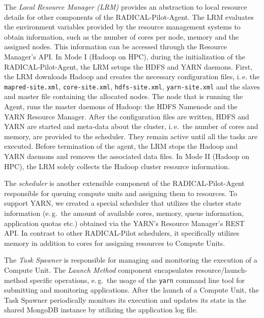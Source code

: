 The \emph{Local Resource Manager (LRM)} provides an abstraction to local resource details for other components of the RADICAL-Pilot-Agent.
The LRM evaluates the environment variables provided by the resource management systems to obtain information, such as the number of cores per node, memory and the assigned nodes.
This information can be accessed through the Resource Manager's API.
In Mode I (Hadoop on HPC), during the initialization of the RADICAL-Pilot-Agent, the LRM setups the HDFS and YARN daemons.
First, the LRM downloads Hadoop and creates the necessary configuration files, i.\,e. the \texttt{mapred-site.xml}, \texttt{core-site.xml}, \texttt{hdfs-site.xml}, \texttt{yarn-site.xml} and the slaves and master file containing the allocated nodes.
The node that is running the Agent, runs the master daemons of Hadoop: the HDFS Namenode and the YARN Resource Manager.
After the configuration files are written, HDFS and YARN are started and meta-data about the cluster, i.\,e.\ the number of cores and memory, are provided to the scheduler.
They remain active until all the tasks are executed.
Before termination of the agent, the LRM stops the Hadoop and YARN daemons and removes the associated data files.
In Mode II (Hadoop on HPC), the LRM solely collects the Hadoop cluster resource information.

The \emph{scheduler} is another extensible component of the RADICAL-Pilot-Agent responsible for queuing compute units and assigning them to resources.
To support YARN, we created a special scheduler that utilizes the cluster state information (e.\,g.\ the amount of available cores, memory, queue information, application quotas etc.) obtained via the YARN's Resource Manager's REST API.
In contrast to other RADICAL-Pilot schedulers, it specifically utilizes memory in addition to cores for assigning resources to Compute Units.

The \emph{Task Spawner} is responsible for managing and monitoring the execution of a Compute Unit.
The \emph{Launch Method} component encapsulates resource/launch-method specific operations, e.\,g.\ the usage of the \texttt{yarn} command line tool for submitting and monitoring applications.
After the launch of a Compute Unit, the Task Spawner periodically monitors its execution and updates its state in the shared MongoDB instance by utilizing the application log file.

